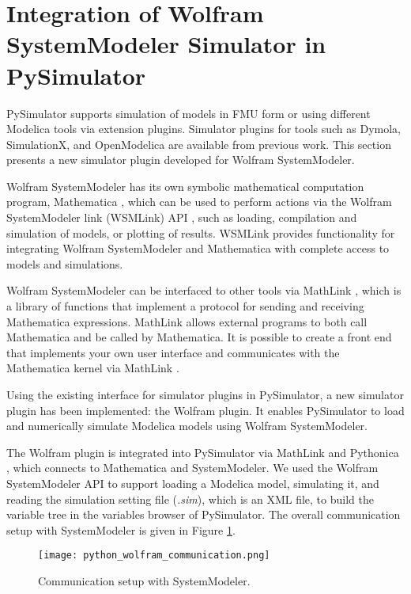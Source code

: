 \clearpage
\section{Integration of Wolfram SystemModeler Simulator in PySimulator}
\label{sec:pythonwolframplugin}

PySimulator supports simulation of models in FMU form or using different Modelica tools via extension
plugins. Simulator plugins for tools such as Dymola, SimulationX, and OpenModelica are available from previous work. 
This section presents a new simulator plugin developed for Wolfram SystemModeler.

Wolfram SystemModeler has its own symbolic mathematical computation program, Mathematica \cite{mathematica}, which can be used
to perform actions via the Wolfram SystemModeler link (WSMLink) API \cite{wsmlink}, such as loading, compilation and 
simulation of models, or plotting of results. WSMLink provides functionality for integrating Wolfram SystemModeler and Mathematica  
with complete access to models and simulations.

Wolfram SystemModeler can be interfaced to other tools via MathLink \cite{mathlink}, which is a library of functions that 
implement a protocol for sending and receiving Mathematica expressions. MathLink \cite{mathlinktutorial,mathlink} allows external
programs to both call Mathematica and be called by Mathematica. It is possible to create a front end that 
implements your own user interface and communicates with the Mathematica kernel via MathLink \cite{mathlinkc}.

Using the existing interface for simulator plugins in PySimulator, a new simulator plugin has
been implemented: the Wolfram plugin. It enables PySimulator to load and numerically simulate
Modelica models using Wolfram SystemModeler.

The Wolfram plugin is integrated into PySimulator via MathLink and Pythonica \cite{pythonica}, which connects to Mathematica and
SystemModeler. We used the Wolfram SystemModeler API to support loading a Modelica model, simulating
it, and reading the simulation setting file (\textit{.sim}), which is an XML file, to build the variable tree in the
variables browser of PySimulator. The overall communication setup with SystemModeler is given in
Figure \ref{fig:pythonwolframcommunication}.

\begin{figure} [!h]
	\texttt{[image: python\_wolfram\_communication.png]}
	\caption{Communication setup with SystemModeler.}
	\label{fig:pythonwolframcommunication}
\end{figure}

